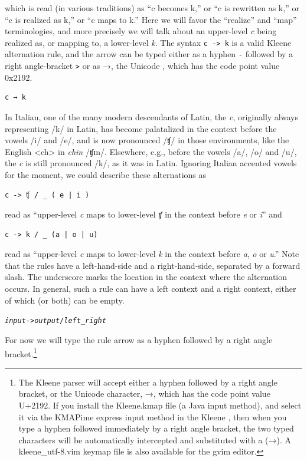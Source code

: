 \noindent
which is read (in various traditions) as ``c becomes k,'' or ``c is rewritten as k,'' or ``c is realized
as k,'' or ``c
maps to k.''  Here we will favor the ``realize'' and ``map'' terminologies, and more precisely we will
talk about an upper-level \emph{c} being realized as, or mapping to, a lower-level \emph{k}.  The syntax
\texttt{c -> k} is a valid Kleene alternation rule, and the arrow can be typed either as a hyphen \texttt{-} followed
by a right angle-bracket \texttt{>} or as →, the Unicode
,
which has the code point value 0x2192.

\begin{Verbatim}
c → k
\end{Verbatim}


In Italian, one of the many modern descendants of Latin, the \emph{c},
originally always representing /k/ in Latin, has become palatalized in the context before the vowels /i/ and
/e/, and is now pronounced /ʧ/ in those environments, like the English
<ch> in \emph{chin} /ʧɪn/.  Elsewhere, e.g.,
before the vowels /a/, /o/ and /u/, the \emph{c} is still pronounced /k/,
as it was in Latin.  Ignoring Italian accented vowels for the moment, we could
describe these alternations as 

\begin{Verbatim}
c -> ʧ / _ ( e | i )
\end{Verbatim}

\noindent
read as ``upper-level \emph{c} maps to lower-level \emph{ʧ} in the context before \emph{e} or \emph{i}'' and

\begin{Verbatim}
c -> k / _ (a | o | u)
\end{Verbatim}

\noindent
read as ``upper-level \emph{c} maps to lower-level \emph{k} in the context before \emph{a}, \emph{o} or \emph{u}.''
Note that the rules have a left-hand-side and a right-hand-side, separated by a forward slash.  The underscore marks
the location in the context where the alternation occurs.  In general, such
a rule can have a left context and a right context, either of which (or
both) can be empty.

\begin{alltt}
\emph{input} -> \emph{output} / \emph{left} _ \emph{right}
\end{alltt}

\noindent
For now we
will type the rule arrow as a hyphen followed by a
right angle bracket.\footnote{The Kleene parser will accept either a hyphen
followed by a right angle bracket, or the Unicode  character, →, which has the code point value U+2192.  If you
install the Kleene.kmap file (a Java input method), and select
it via the KMAPime express input method in the Kleene , then when you type a hyphen followed immediately by a
right angle bracket, the two typed characters will be automatically
intercepted and substituted with a  (→).  A
kleene\_utf-8.vim keymap file is also available for the gvim editor.}

